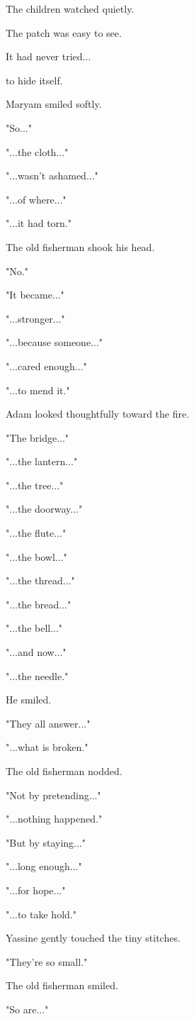 \documentclass[12pt,openany]{book}
\begin{document}
The children watched quietly.

The patch was easy to see.

It had never tried...

to hide itself.

Maryam smiled softly.

"So..."

"...the cloth..."

"...wasn't ashamed..."

"...of where..."

"...it had torn."

The old fisherman shook his head.

"No."

"It became..."

"...stronger..."

"...because someone..."

"...cared enough..."

"...to mend it."

Adam looked thoughtfully toward the fire.

"The bridge..."

"...the lantern..."

"...the tree..."

"...the doorway..."

"...the flute..."

"...the bowl..."

"...the thread..."

"...the bread..."

"...the bell..."

"...and now..."

"...the needle."

He smiled.

"They all answer..."

"...what is broken."

The old fisherman nodded.

"Not by pretending..."

"...nothing happened."

"But by staying..."

"...long enough..."

"...for hope..."

"...to take hold."

Yassine gently touched the tiny stitches.

"They're so small."

The old fisherman smiled.

"So are..."
\end{document}
